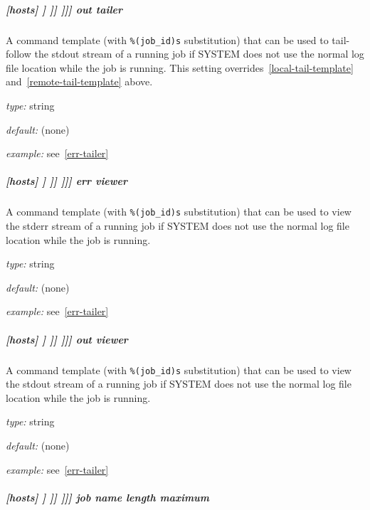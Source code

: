 \subparagraph[{[[[[}SYSTEM{]]]]}out tailer]{[hosts] \textrightarrow [[HOST]] \textrightarrow [[[batch systems]]] \textrightarrow [[[[SYSTEM]]]] \textrightarrow out tailer}
\label{out-tailer}

A command template (with \lstinline=%(job_id)s= substitution) that can be used
to tail-follow the stdout stream of a running job if SYSTEM does
not use the normal log file location while the job is running.  This setting
overrides~\ref{local-tail-template} and~\ref{remote-tail-template} above.

\begin{myitemize}
\item {\em type:} string
\item {\em default:} (none)
\item {\em example:} see~\ref{err-tailer}
\end{myitemize}

\subparagraph[{[[[[}SYSTEM{]]]]}err viewer]{[hosts] \textrightarrow [[HOST]] \textrightarrow [[[batch systems]]] \textrightarrow [[[[SYSTEM]]]] \textrightarrow err viewer}

A command template (with \lstinline=%(job_id)s= substitution) that can be used
to view the stderr stream of a running job if SYSTEM does
not use the normal log file location while the job is running.

\begin{myitemize}
\item {\em type:} string
\item {\em default:} (none)
\item {\em example:} see~\ref{err-tailer}
\end{myitemize}

\subparagraph[{[[[[}SYSTEM{]]]]}out viewer]{[hosts] \textrightarrow [[HOST]] \textrightarrow [[[batch systems]]] \textrightarrow [[[[SYSTEM]]]] \textrightarrow out viewer}

A command template (with \lstinline=%(job_id)s= substitution) that can be used
to view the stdout stream of a running job if SYSTEM does
not use the normal log file location while the job is running.

\begin{myitemize}
\item {\em type:} string
\item {\em default:} (none)
\item {\em example:} see~\ref{err-tailer}
\end{myitemize}

\subparagraph[{[[[[}SYSTEM{]]]]}job name length maximum]{[hosts] \textrightarrow [[HOST]] \textrightarrow [[[batch systems]]] \textrightarrow [[[[SYSTEM]]]] \textrightarrow job name length maximum}

